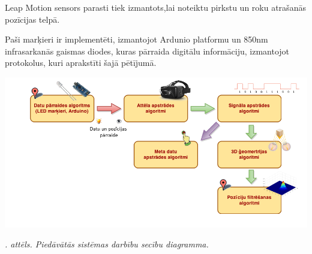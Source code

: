 \documentclass[12pt, a4paper, oneside, openright]{article}
\renewcommand{\thecimages}{\arabic{cimages}}
\begin{document}
Leap Motion sensors parasti tiek izmantots,lai noteiktu pirkstu un roku atrašanās pozīcijas telpā. 

Paši marķieri ir implementēti, izmantojot 
Ardunio platformu un 850nm infrasarkanās gaismas diodes, kuras pārraida digitālu informāciju, izmantojot
protokolus, kuri aprakstīti šajā pētījumā.

\label{cimages:MainDiagram}
\vspace{10pt}
\begin{samepage}
\begin{center}
\includegraphics[width=1\columnwidth]{images/MainDiagram.png}
\begin{center}
\footnotesize{
\textit{\thecimages. attēls. Piedāvātās sistēmas darbību secību diagramma.}}
\end{center}
\end{center}
\end{samepage}
\end{document}
